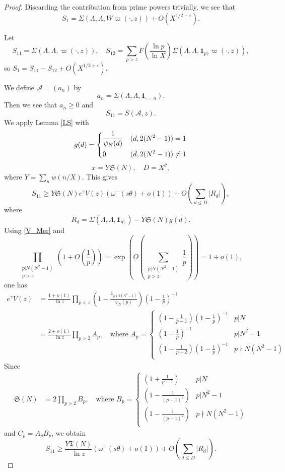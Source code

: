 \documentclass{amsart}
\theoremstyle{definition}
\theoremstyle{remark}
\newcommand{\1}{
    \bm{1}
}
\begin{document}
\begin{proof}
Discarding the contribution from prime powers trivially, we see that
\[ S_1 = \Sigma(\Lambda,\Lambda,W\varpi(\cdot,z)) + O(X^{1/2+\varepsilon}). \]

Let
\[ S_{11} = \Sigma(\Lambda,\Lambda,\varpi(\cdot,z)), \quad S_{12} = \sum_{p>z} F\left(\frac{\ln{p}}{\ln{X}}\right) \Sigma(\Lambda,\Lambda,\1_{p|\cdot} \varpi(\cdot,z)), \]
so $S_1=S_{11}-S_{12}+O(X^{1/2+\varepsilon})$. 

We define $\mathcal{A}=(a_n)$ by
\[ a_n = \Sigma(\Lambda,\Lambda,\1_{\cdot=n}). \]
Then we see that $a_n \geq 0$ and
\[ S_{11} = S(\mathcal{A},z) . \]
We apply Lemma \ref{LS} with 
\begin{align*} g(d) = 
\begin{dcases}
\frac{1}{\psi_N(d)} & (d,2(N^2-1)) = 1 \\
0 & (d,2(N^2-1)) \neq 1
\end{dcases}
\end{align*}
\[ x = Y \mathfrak{S}(N), \quad D=X^{\theta}, \]
where $Y= \sum_{n} w(n/X)$. This gives
\begin{equation} S_{11} \geq Y \mathfrak{S}(N) e^{\gamma} V(z) (\omega^{-}(s \theta)+o(1)) + O\left( \sum_{d \leq D} \left| R_d \right| \right), \label{S11p} \end{equation}
where
\[ R_d = \Sigma(\Lambda,\Lambda,\1_{d|\cdot}) - Y\mathfrak{S}(N) g(d). \]
Using \eqref{V_Mer} and 
\[ \prod_{\substack{p|N(N^2-1) \\ p>z}} \left(1 + O\left( \frac{1}{p} \right) \right) = \exp\left( O\left( \sum_{\substack{p|N(N^2-1) \\ p>z}} \frac{1}{p} \right) \right) = 1+o(1), \]
one has
\begin{align*}
e^{\gamma} V(z) &= \frac{1+o(1)}{\ln{z}} \prod_{p < z} \left(1 - \frac{\1_{p\nmid 2(N^2-1)}}{\psi_N(p)} \right) \left(1- \frac{1}{p} \right)^{-1} \\
&= \frac{2+o(1)}{\ln{z}} \prod_{p>2} A_p, \quad \text{where } A_p=
\begin{cases}
\left(1 - \frac{1}{p-1} \right) \left(1- \frac{1}{p} \right)^{-1} & p|N \\
\left(1- \frac{1}{p} \right)^{-1} & p|N^2-1 \\
\left(1 - \frac{1}{p-2} \right) \left(1- \frac{1}{p} \right)^{-1} & p\nmid N(N^2-1) \\
\end{cases}
\end{align*}
Since
\begin{align*}
\mathfrak{S}(N) &= 2 \prod_{p>2} B_p, \quad \text{where }
B_p =
\begin{cases}
\left(1 + \frac{1}{p-1} \right) & p|N \\
\left(1 - \frac{1}{(p-1)^2} \right) & p|N^2-1 \\
\left(1 - \frac{1}{(p-1)^2} \right) & p\nmid N(N^2-1) \\
\end{cases}
\end{align*}
and $C_p=A_p B_p$, we obtain
\[ S_{11} \geq \frac{Y \mathfrak{T}(N)}{\ln{z}} (\omega^{-}(s\theta)+o(1)) + O\left( \sum_{d \leq D} \left| R_d \right| \right). \]


\end{proof}
\end{document}
